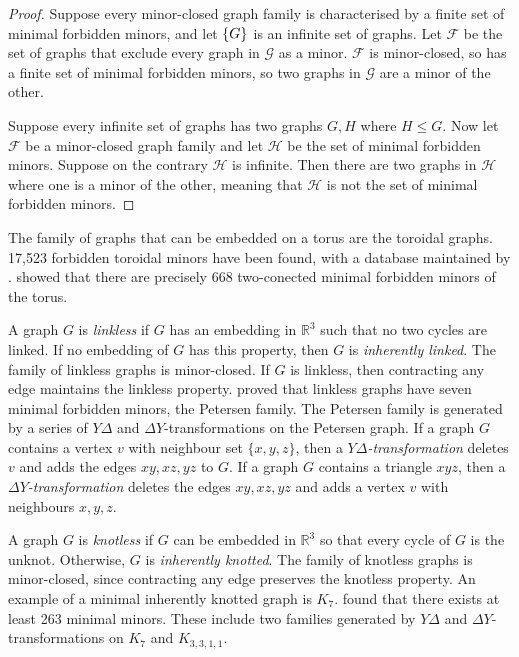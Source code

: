\begin{proof}
	Suppose every minor-closed graph family is characterised by a finite set of minimal forbidden minors, and let $\mathcal\{G\}$ is an infinite set of graphs. Let $\mathcal{F}$ be the set of graphs that exclude every graph in $\mathcal{G}$ as a minor. $\mathcal{F}$ is minor-closed, so has a finite set of minimal forbidden minors, so two graphs in $\mathcal{G}$ are a minor of the other. 

	Suppose every infinite set of graphs has two graphs $G, H$ where $H \leq G$. Now let $\mathcal{F}$ be a minor-closed graph family and let $\mathcal{H}$ be the set of minimal forbidden minors. Suppose on the contrary $\mathcal{H}$ is infinite. Then there are two graphs in $\mathcal{H}$ where one is a minor of the other, meaning that $\mathcal{H}$ is not the set of minimal forbidden minors.
\end{proof}

The family of graphs that can be embedded on a torus are the toroidal graphs. 17,523 forbidden toroidal minors have been found, with a database maintained by \textcite{myrvoldLargeSetTorus2018}. \textcite{moharExcludedMinorsKlein2024} showed that there are precisely $668$ two-conected minimal forbidden minors of the torus.

A graph $G$ is \textit{linkless} if $G$ has an embedding in $\mathbb{R}^3$ such that no two cycles are linked. If no embedding of $G$ has this property, then $G$ is \textit{inherently linked}. The family of linkless graphs is minor-closed. If $G$ is linkless, then contracting any edge maintains the linkless property. \textcite{robertsonSachsLinklessEmbedding1995} proved that linkless graphs have seven minimal forbidden minors, the Petersen family. The Petersen family is generated by a series of $Y \Delta$ and $\Delta Y$-transformations on the Petersen graph. If a graph $G$ contains a vertex $v$ with neighbour set $\{x,y,z\}$, then a \textit{$Y \Delta$-transformation} deletes $v$ and adds the edges $xy,xz, yz$ to $G$. If a graph $G$ contains a triangle $xyz$, then a \textit{$\Delta Y$-transformation} deletes the edges $xy, xz, yz$ and adds a vertex $v$ with neighbours $x, y, z$. 

A graph $G$ is \textit{knotless} if $G$ can be embedded in $\mathbb{R}^3$ so that every cycle of $G$ is the unknot. Otherwise, $G$ is \textit{inherently knotted}. The family of knotless graphs is minor-closed, since contracting any edge preserves the knotless property. An example of a minimal inherently knotted graph is $K_7$. \textcite{goldbergManyManyMore2014} found that there exists at least 263 minimal minors. These include two families generated by $Y \Delta$ and $\Delta Y$-transformations on $K_7$ and $K_{3,3,1,1}$. 

